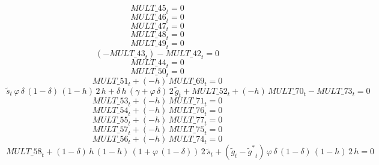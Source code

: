 \begin{dmath}
{MULT\_45}_{t}=0
\end{dmath}
\begin{dmath}
{MULT\_46}_{t}=0
\end{dmath}
\begin{dmath}
{MULT\_47}_{t}=0
\end{dmath}
\begin{dmath}
{MULT\_48}_{t}=0
\end{dmath}
\begin{dmath}
{MULT\_49}_{t}=0
\end{dmath}
\begin{dmath}
\left(-{MULT\_43}_{t}\right)-{MULT\_42}_{t}=0
\end{dmath}
\begin{dmath}
{MULT\_44}_{t}=0
\end{dmath}
\begin{dmath}
{MULT\_50}_{t}=0
\end{dmath}
\begin{dmath}
{MULT\_51}_{t}+\left(-{{h}}\right)\, {MULT\_69}_{t}=0
\end{dmath}
\begin{dmath}
{{\tilde s}}_{t}\, {{\varphi}}\, {{\delta}}\, \left(1-{{\delta}}\right)\, \left(1-{{h}}\right)\, 2\, {{h}}+{{\delta}}\, {{h}}\, \left({{\gamma}}+{{\varphi}}\, {{\delta}}\right)\, 2\, {{\tilde g}}_{t}+{MULT\_52}_{t}+\left(-{{h}}\right)\, {MULT\_70}_{t}-{MULT\_73}_{t}=0
\end{dmath}
\begin{dmath}
{MULT\_53}_{t}+\left(-{{h}}\right)\, {MULT\_71}_{t}=0
\end{dmath}
\begin{dmath}
{MULT\_54}_{t}+\left(-{{h}}\right)\, {MULT\_76}_{t}=0
\end{dmath}
\begin{dmath}
{MULT\_55}_{t}+\left(-{{h}}\right)\, {MULT\_77}_{t}=0
\end{dmath}
\begin{dmath}
{MULT\_57}_{t}+\left(-{{h}}\right)\, {MULT\_75}_{t}=0
\end{dmath}
\begin{dmath}
{MULT\_56}_{t}+\left(-{{h}}\right)\, {MULT\_74}_{t}=0
\end{dmath}
\begin{dmath}
{MULT\_58}_{t}+\left(1-{{\delta}}\right)\, {{h}}\, \left(1-{{h}}\right)\, \left(1+{{\varphi}}\, \left(1-{{\delta}}\right)\right)\, 2\, {{\tilde s}}_{t}+\left({{\tilde g}}_{t}-{{\tilde g^*}}_{t}\right)\, {{\varphi}}\, {{\delta}}\, \left(1-{{\delta}}\right)\, \left(1-{{h}}\right)\, 2\, {{h}}=0
\end{dmath}
